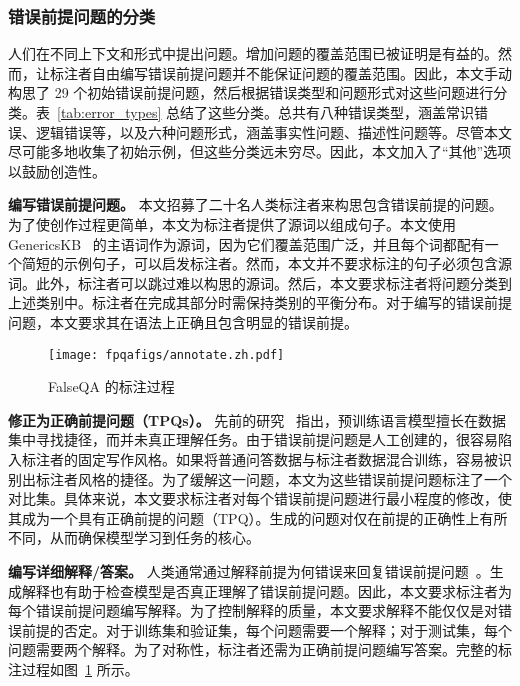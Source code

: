 \subsubsection{错误前提问题的分类}
人们在不同上下文和形式中提出问题。增加问题的覆盖范围已被证明是有益的\cite{khashabi-etal-2020-unifiedqa}。然而，让标注者自由编写错误前提问题并不能保证问题的覆盖范围。因此，本文手动构思了 29 个初始错误前提问题，然后根据错误类型和问题形式对这些问题进行分类。表~\ref{tab:error_types} 总结了这些分类。总共有八种错误类型，涵盖常识错误、逻辑错误等，以及六种问题形式，涵盖事实性问题、描述性问题等。尽管本文尽可能多地收集了初始示例，但这些分类远未穷尽。因此，本文加入了“其他”选项以鼓励创造性。

\textbf{编写错误前提问题。} 本文招募了二十名人类标注者来构思包含错误前提的问题。为了使创作过程更简单，本文为标注者提供了源词以组成句子。本文使用 GenericsKB~\cite{bhakthavatsalam2020genericskb} 的主语词作为源词，因为它们覆盖范围广泛，并且每个词都配有一个简短的示例句子，可以启发标注者。然而，本文并不要求标注的句子必须包含源词。此外，标注者可以跳过难以构思的源词。然后，本文要求标注者将问题分类到上述类别中。标注者在完成其部分时需保持类别的平衡分布。对于编写的错误前提问题，本文要求其在语法上正确且包含明显的错误前提。



\begin{figure}[!htbp]
    \centering
    \texttt{[image: fpqafigs/annotate.zh.pdf]}
    \caption{FalseQA 的标注过程}
    \label{fig:annotateprocess}
\end{figure}

\textbf{修正为正确前提问题（TPQs）。} 先前的研究~\cite{du-etal-2021-towards} 指出，预训练语言模型擅长在数据集中寻找捷径，而并未真正理解任务。由于错误前提问题是人工创建的，很容易陷入标注者的固定写作风格。如果将普通问答数据与标注者数据混合训练，容易被识别出标注者风格的捷径。为了缓解这一问题，本文为这些错误前提问题标注了一个对比集。具体来说，本文要求标注者对每个错误前提问题进行最小程度的修改，使其成为一个具有正确前提的问题（TPQ）。生成的问题对仅在前提的正确性上有所不同，从而确保模型学习到任务的核心。

\textbf{编写详细解释/答案。} 人类通常通过解释前提为何错误来回复错误前提问题~\cite{kaplan1978indirect}。生成解释也有助于检查模型是否真正理解了错误前提问题。因此，本文要求标注者为每个错误前提问题编写解释。为了控制解释的质量，本文要求解释不能仅仅是对错误前提的否定。对于训练集和验证集，每个问题需要一个解释；对于测试集，每个问题需要两个解释。为了对称性，标注者还需为正确前提问题编写答案。完整的标注过程如图~\ref{fig:annotateprocess} 所示。

